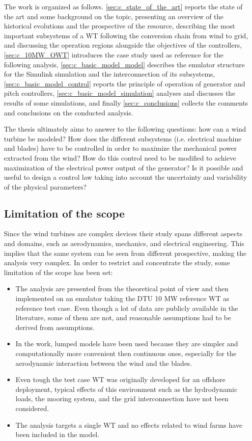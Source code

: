 The work is organized as follows. \autoref{sec:c_state_of_the_art} reports the state of the art and some background on the topic, presenting an overview of the historical evolutions and the prospective of the resource, describing the most important subsystems of a WT following the conversion chain from wind to grid, and discussing the operation regions alongside the objectives of the controllers, \autoref{sec:c_10MW_OWT} introduces the case study used as reference for the following analysis, \autoref{sec:c_basic_model_model} describes the emulator structure for the Simulink simulation and the interconnection of its subsystems, \autoref{sec:c_basic_model_control} reports the principle of operation of generator and pitch controllers, \autoref{sec:c_basic_model_simulation} analyses and discusses the results of some simulations, and finally \autoref{sec:c_conclusions} collects the comments and conclusions on the conducted analysis.

The thesis ultimately aims to answer to the following questions: how can a wind turbine be modeled? How does the different subsystems (i.e. electrical machine and blades) have to be controlled in order to maximize the mechanical power extracted from the wind? How do this control need to be modified to achieve maximization of the electrical power output of the generator? Is it possible and useful to design a control law taking into account the uncertainty and variability of the physical parameters?

\subsection{Limitation of the scope}\label{subsec:limitation_of_scope}
Since the wind turbines are complex devices their study spans different aspects and domains, such as aerodynamics, mechanics, and electrical engineering. This implies that the same system can be seen from different prospective, making the analysis very complex. In order to restrict and concentrate the study, some limitation of the scope has been set:
\begin{itemize}
  \item The analysis are presented from the theoretical point of view and then implemented on an emulator taking the DTU 10 MW reference \acrshort{WT} as reference test case. Even though a lot of data are publicly available in the literature, some of them are not, and reasonable assumptions had to be derived from assumptions.
  \item In the work, lumped models have been used because they are simpler and computationally more convenient then continuous ones, especially for the aerodynamic interaction between the wind and the blades.
  \item Even tough the test case WT was originally developed for an offshore deployment, typical effects of this environment such as the hydrodynamic loads, the mooring system, and the grid interconnection have not been considered. 
  \item The analysis targets a single WT and no effects related to wind farms have been included in the model. 
\end{itemize}